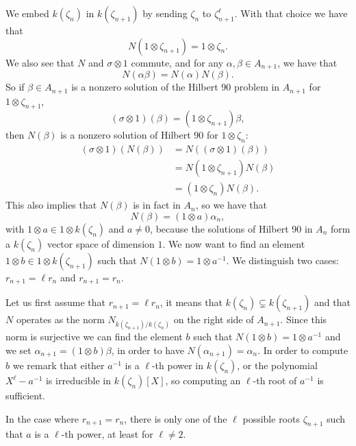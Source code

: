 \documentclass[a4paper,11pt]{article}
\begin{document}
We embed $k(\zeta_n)$ in $k(\zeta_{n+1})$ by sending $\zeta_n$ to
$\zeta_{n+1}^\ell$. With that choice we have that
\[
  N(1\otimes\zeta_{n+1})=1\otimes\zeta_n.
\]
We also see that $N$ and $\sigma\otimes1$ commute, and for any $\alpha,
\beta\in A_{n+1}$, we have that \[
  N(\alpha\beta) = N(\alpha)N(\beta).
\]
So if $\beta\in A_{n+1}$ is a nonzero solution of the Hilbert 90 problem in $A_{n+1}$ for
$1\otimes\zeta_{n+1}$, \ie
\[
  (\sigma\otimes 1)(\beta) = (1\otimes\zeta_{n+1})\beta,
\]
then $N(\beta)$ is a nonzero solution of Hilbert 90 for $1\otimes\zeta_n$:
\begin{align*}
  (\sigma\otimes1)(N(\beta)) &= N((\sigma\otimes1)(\beta)) \\
  &= N(1\otimes\zeta_{n+1})N(\beta) \\
  &= (1\otimes\zeta_n)N(\beta).
\end{align*}
This also implies that $N(\beta)$ is in fact in $A_n$, so we have that
\[
  N(\beta) = (1\otimes a)\alpha_n,
\]
with $1\otimes a\in 1\otimes k(\zeta_n)$ and $a\neq0$, because the solutions of Hilbert 90 in $A_n$
form a $k(\zeta_n)$ vector space of dimension $1$. We now want to find an
element $1\otimes b\in1\otimes k(\zeta_{n+1})$ such that $N(1\otimes b)=1\otimes a^{-1}$. We distinguish two
cases: $r_{n+1}=\ell r_n$ and $r_{n+1}=r_n$.

Let us first assume that $r_{n+1}=\ell r_n$, it means that $k(\zeta_n)\subsetneq
k(\zeta_{n+1})$ and that $N$ operates as the norm
$N_{k(\zeta_{n+1})/k(\zeta_n)}$ on the right side of $A_{n+1}$. Since this norm
is surjective we can find the  element $b$ such that $N(1\otimes b)=1\otimes a^{-1}$ and
we set $\alpha_{n+1}= (1\otimes b)\beta$, in order to have
$N(\alpha_{n+1})=\alpha_n$. In order to compute $b$ we remark that either
$a^{-1}$ is a $\ell$-th power in $k(\zeta_n)$, or the polynomial
$X^\ell-a^{-1}$ is irreducible in $k(\zeta_n)[X]$, so computing an $\ell$-th
root of $a^{-1}$ is sufficient.

In the case where $r_{n+1}=r_n$, there is only one of the $\ell$ possible roots
$\zeta_{n+1}$ such that $a$ is a $\ell$-th power, at least for $\ell\neq2$.
\end{document}
